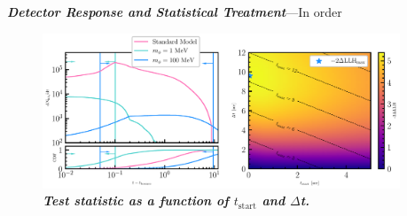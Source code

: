 \textbf{\textit{Detector Response and Statistical Treatment}}---In order 

\begin{figure}
    \centering
    \includegraphics[width=0.95\textwidth]{figures/hits_and_likelihood.pdf}
    \caption{\textbf{\textit{Test statistic as a function of $t_{\mathrm{start}}$ and $\Delta$t.}
    }}
    \label{fig:hits_and_likelihood}
\end{figure}